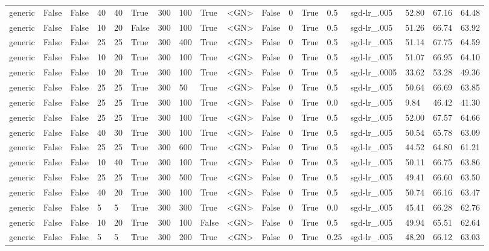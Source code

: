 \begin{adjustbox}{rotate=90,height=\textheight,width=\textwidth}
\begin{tabular}{llllllllllllllllll}
generic & False & False & 40 & 40 & True & 300 & 100 & True & <GN> & False & 0 & True & 0.5 & sgd-lr\_.005 & 52.80 & 67.16 & 64.48\\
generic & False & False & 10 & 20 & False & 300 & 100 & True & <GN> & False & 0 & True & 0.5 & sgd-lr\_.005 & 51.26 & 66.74 & 63.92\\
generic & False & False & 25 & 25 & True & 300 & 400 & True & <GN> & False & 0 & True & 0.5 & sgd-lr\_.005 & 51.14 & 67.75 & 64.59\\
generic & False & False & 10 & 20 & True & 300 & 100 & True & <GN> & False & 0 & True & 0.5 & sgd-lr\_.005 & 51.07 & 66.95 & 64.10\\
generic & False & False & 10 & 20 & True & 300 & 100 & True & <GN> & False & 0 & True & 0.5 & sgd-lr\_.0005 & 33.62 & 53.28 & 49.36\\
generic & False & False & 25 & 25 & True & 300 & 50 & True & <GN> & False & 0 & True & 0.5 & sgd-lr\_.005 & 50.64 & 66.69 & 63.85\\
generic & False & False & 25 & 25 & True & 300 & 100 & True & <GN> & False & 0 & True & 0.0 & sgd-lr\_.005 & 9.84 & 46.42 & 41.30\\
generic & False & False & 25 & 25 & True & 300 & 100 & True & <GN> & False & 0 & True & 0.5 & sgd-lr\_.005 & 52.00 & 67.57 & 64.66\\
generic & False & False & 40 & 30 & True & 300 & 100 & True & <GN> & False & 0 & True & 0.5 & sgd-lr\_.005 & 50.54 & 65.78 & 63.09\\
generic & False & False & 25 & 25 & True & 300 & 600 & True & <GN> & False & 0 & True & 0.5 & sgd-lr\_.005 & 44.52 & 64.80 & 61.21\\
generic & False & False & 10 & 40 & True & 300 & 100 & True & <GN> & False & 0 & True & 0.5 & sgd-lr\_.005 & 50.11 & 66.75 & 63.86\\
generic & False & False & 25 & 25 & True & 300 & 500 & True & <GN> & False & 0 & True & 0.5 & sgd-lr\_.005 & 49.41 & 66.60 & 63.50\\
generic & False & False & 40 & 20 & True & 300 & 100 & True & <GN> & False & 0 & True & 0.5 & sgd-lr\_.005 & 50.74 & 66.16 & 63.47\\
generic & False & False & 5 & 5 & True & 300 & 300 & True & <GN> & False & 0 & True & 0.0 & sgd-lr\_.005 & 45.41 & 66.28 & 62.76\\
generic & False & False & 10 & 20 & True & 300 & 100 & False & <GN> & False & 0 & True & 0.5 & sgd-lr\_.005 & 49.94 & 65.51 & 62.64\\
generic & False & False & 5 & 5 & True & 300 & 200 & True & <GN> & False & 0 & True & 0.25 & sgd-lr\_.005 & 48.20 & 66.12 & 63.03\\

\end{tabular}
\end{adjustbox}
